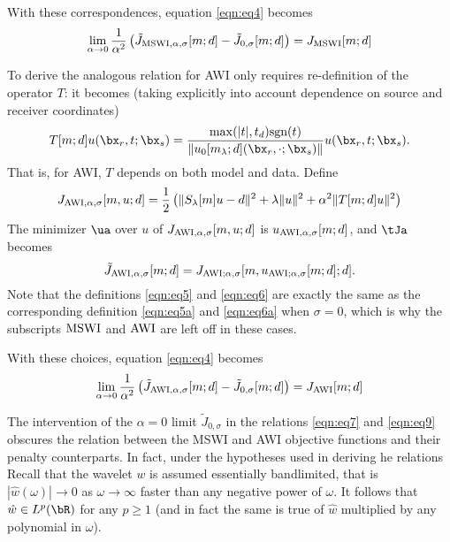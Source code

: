 With these correspondences, equation \ref{eqn:eq4} becomes
\begin{equation}
  \label{eqn:eq7}
  \lim_{\alpha \rightarrow 0}
  \frac{1}{\alpha^2}\left(\tilde{J}_{{\rm MSWI},\alpha,\sigma}[m;d]-\tilde{J}_{0,\sigma}[m;d]\right)=
  J_{\rm MSWI}[m;d]
\end{equation}

To derive the analogous relation for AWI only requires re-definition
of the operator $T$: it becomes (taking explicitly into account
dependence on source and receiver coordinates)
\begin{equation}
  \label{eqn:eq8}
  T[m;d] u(\bx_r,t;\bx_s) = \frac{\max(|t|, t_d)
    \mbox{sgn}(t)}{\|u_0[m_{\lambda};d](\bx_r,\cdot;\bx_s)\|}
  u(\bx_r,t;\bx_s).
\end{equation}
That is, for AWI, $T$ depends on both model and data. Define
\begin{equation}
  \label{eqn:eq5a}
   J_{{\rm AWI},\alpha,\sigma}[m,u;d] = \frac{1}{2}\left(\|S_{\lambda}[m]u-d\|^2 +
   \lambda\|u\|^2 + \alpha^2\|T[m;d]u\|^2\right)
 \end{equation}
The minimizer $\ua$ over $u$ of $ J_{{\rm AWI}, \alpha,\sigma}[m,u;d]$ is
$u_{{\rm AWI},\alpha,\sigma}[m;d]$, and $\tJa$ becomes
\begin{equation}
  \label{eqn:eq6a}
  \tilde{J}_{{\rm AWI},\alpha,\sigma}[m;d] =
  J_{{\rm AWI};\alpha,\sigma}[m,u_{{\rm AWI};\alpha,\sigma}[m;d];d].
\end{equation}
Note that the definitions \ref{eqn:eq5} and \ref{eqn:eq6} are exactly
the same as the corresponding definition \ref{eqn:eq5a} and
\ref{eqn:eq6a} when $\sigma=0$, which is why the subscripts ${\rm
  MSWI}$ and ${\rm AWI}$ are left off in these cases.

With these choices, equation \ref{eqn:eq4} becomes 
\begin{equation}
  \label{eqn:eq9}
  \lim_{\alpha \rightarrow 0}
  \frac{1}{\alpha^2}\left(\tilde{J}_{{\rm AWI},\alpha,\sigma}[m;d]-\tilde{J}_{0,\sigma}[m;d]\right)=
  J_{\rm AWI}[m;d]
\end{equation}

The intervention of the $\alpha=0$ limit $\tilde{J}_{0,\sigma}$ in the
relations \ref{eqn:eq7} and \ref{eqn:eq9} obscures the relation
between the MSWI and AWI objective functions and their penalty
counterparts. In fact, under the hypotheses used in deriving he
relations 
Recall that the wavelet $w$ is assumed essentially bandlimited, that is
$|\hat{w}(\omega)| \rightarrow 0$ as $\omega \rightarrow \infty$
faster than any negative power of $\omega$. It follows that $\hat{w}
\in L^p(\bR)$ for any $p \ge 1$ (and in fact the same is true of
$\hat{w}$ multiplied by any polynomial in $\omega$). 

